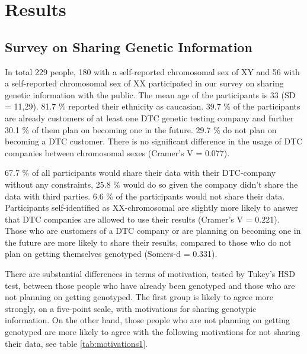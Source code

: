 \documentclass[10pt]{article}
\begin{document}
\section*{Results}
\subsection*{Survey on Sharing Genetic Information}
In total 229 people, 180 with a self-reported chromosomal sex of XY and 56 with a self-reported chromosomal sex of XX participated in our survey on sharing genetic information with the public. 
The mean age of the participants is 33 (SD = 11,29). 81.7 \% reported their ethnicity as caucasian. 39.7 \% of the participants are already 
customers of at least one DTC genetic testing company and further 30.1 \% of them plan on becoming one in the future. 29.7 \% do not plan on 
becoming a DTC customer. There is no significant difference in the usage of DTC companies between chromosomal sexes (Cramer's V = 0.077). 

67.7 \% of all participants would share their data with their DTC-company without any constraints, 25.8 \% would do so given the company 
didn't share the data with third parties. 6.6 \% of the participants would not share their data. Participants self-identified as XX-chromosomal are slightly more likely to answer that DTC companies are allowed to use their results (Cramer's V = 0.221). Those who are customers of a DTC company or are planning on becoming one in 
the future are more likely to share their results, compared to those who do not plan on getting themselves genotyped (Somers-d = 0.331). 


There are substantial differences in terms of motivation, tested by Tukey's HSD test, between those people who have already been genotyped 
and those who are not planning on getting genotyped. The first group is likely to agree more strongly, on a five-point scale, with motivations for sharing genotypic information. On the other hand, those people who are not planning on getting genotyped are more likely to agree with the following motivations 
for not sharing their data, see table \ref{tab:motivations1}.
\end{document}
